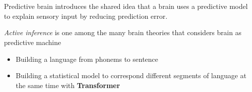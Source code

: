 \section{}
    
    \begin{frame}[allowframebreaks]{Predictive brain}
        \cite{spratling-2017-a-review-of-predictive-coding-algorithms} introduces the shared idea that a brain uses a predictive model to explain sensory input by reducing prediction error.
        
        \textit{Active inference} \cite{friston-2005-a-predictive-brain-how-perception-and-action-are-coupled-in-neural-networks} is one among the many brain theories that considers brain as predictive machine
        
        \begin{itemize}
            \item Building a language from phonems to sentence
            \item Building a statistical model to correspond different segments of language at the same time with \textbf{Transformer}
        \end{itemize}
    
    
    \end{frame}
    
    \subsection{}
        
        
    